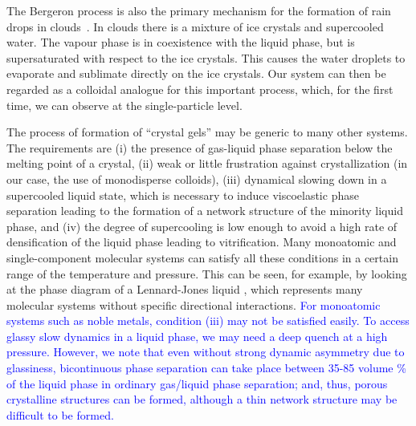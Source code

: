 \documentclass[preprint,amsmath,amssymb,superscriptaddress]{revtex4-1}
\begin{document}
The Bergeron process is also the primary mechanism for the formation of rain drops in clouds~\cite{glickman2000glossary,morrison2012resilience}.
In clouds there is a mixture of ice crystals and supercooled water. The vapour phase is in coexistence with the liquid phase, but is supersaturated
with respect to the ice crystals. This causes the water droplets to evaporate and sublimate directly on the ice crystals. Our system can then
be regarded as a colloidal analogue for this important process, which, for the first time, we can observe at the single-particle level.  

The process of formation of ``crystal gels'' may be generic to many other 
systems. The requirements are (i) the presence of gas-liquid phase separation below the melting point of a crystal, (ii) 
weak or little frustration against crystallization (in our case, the use of monodisperse colloids), 
(iii) dynamical slowing down in a supercooled liquid state, which is necessary to induce viscoelastic phase separation leading to the formation 
of a network structure of the minority liquid phase, and (iv) the degree of supercooling is low enough to avoid a high rate of densification of the liquid phase 
leading to vitrification.  
Many monoatomic and single-component molecular systems can satisfy all these conditions in a certain range of the temperature and pressure. 
This can be seen, for example, by looking at the phase diagram of a Lennard-Jones liquid \cite{lodge1997brownian}, which represents many molecular systems 
without specific directional interactions. \textcolor{blue}{For monoatomic systems such as noble metals, condition (iii) may not be satisfied easily. 
To access glassy slow dynamics in a liquid phase, we may need a deep quench at a high pressure. However, we note that even without strong dynamic asymmetry 
due to glassiness, bicontinuous phase separation can take place between 35-85 volume \% of the liquid phase in ordinary gas/liquid phase separation; 
and, thus, porous crystalline structures can be formed, although a thin network structure may be difficult to be formed.}
\end{document}
